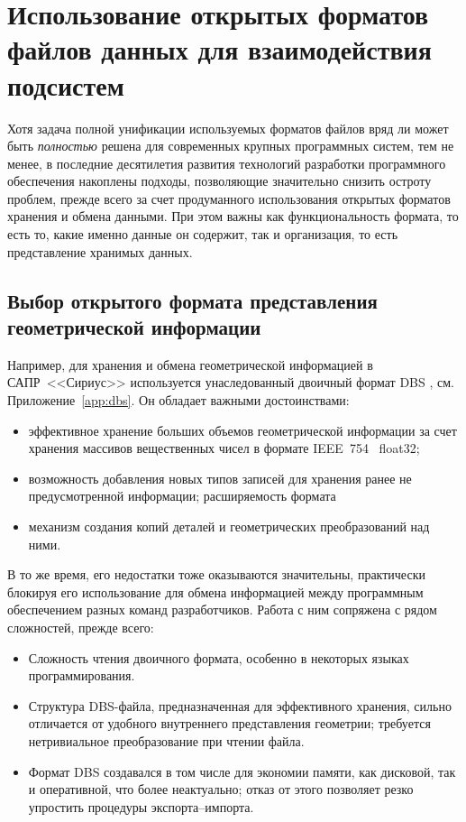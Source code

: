 
\section{%
  Использование открытых форматов файлов данных для взаимодействия подсистем
}
\label{sec:json.files}

Хотя задача полной унификации
используемых форматов файлов
вряд ли может быть
\textit{полностью}
решена для современных крупных программных систем,
тем не менее,
в последние десятилетия развития технологий
разработки программного обеспечения
накоплены подходы,
позволяющие значительно снизить остроту проблем,
прежде всего за счет продуманного использования
открытых форматов хранения и обмена данными.
При этом важны как функциональность формата,
то есть то, какие именно данные он содержит,
так и организация,
то есть представление
хранимых данных.

\subsection{%
Выбор открытого формата представления геометрической информации
}

Например, для хранения и обмена геометрической информацией
в САПР~<<Сириус>>
используется унаследованный двоичный формат DBS
\cite{bi:DBS},
см. Приложение~\ref{app:dbs}.
Он обладает важными достоинствами:
\begin{itemize}
  \item
  эффективное хранение больших объемов геометрической информации
  за счет хранения массивов вещественных чисел в формате IEEE~754~\cite{bi:IEEE754} float32;
  \item
  возможность добавления новых типов записей для хранения ранее не предусмотренной информации;
  расширяемость формата
  \item
  механизм создания копий деталей и геометрических преобразований над ними.
\end{itemize}

В то же время,
его недостатки тоже оказываются
значительны,
практически блокируя его использование
для обмена информацией между
программным обеспечением разных команд разработчиков.
Работа с ним сопряжена с рядом сложностей,
прежде всего:
\begin{itemize}
  \item
  Сложность чтения двоичного формата,
  особенно в некоторых языках программирования.
  \item
  Структура DBS-файла,
  предназначенная для эффективного хранения,
  сильно отличается от удобного внутреннего представления
  геометрии;
  требуется нетривиальное преобразование при чтении файла.
  \item
  Формат DBS создавался в том числе для экономии памяти,
  как дисковой, так и оперативной,
  что более неактуально;
  отказ от этого позволяет резко упростить процедуры экспорта--импорта.
\end{itemize}

